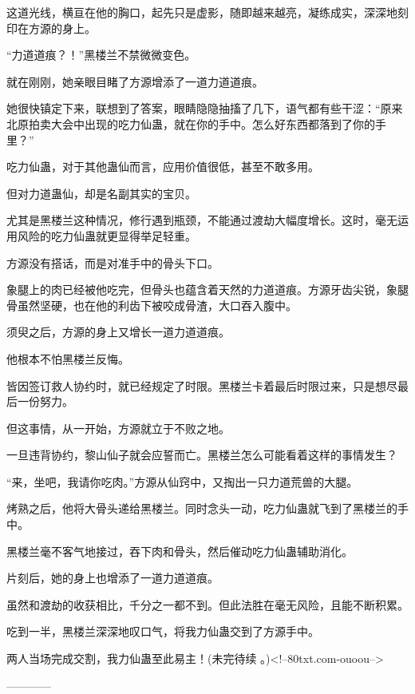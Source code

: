 \begin{this_body}
这道光线，横亘在他的胸口，起先只是虚影，随即越来越亮，凝练成实，深深地刻印在方源的身上。

“力道道痕？！”黑楼兰不禁微微变色。

就在刚刚，她亲眼目睹了方源增添了一道力道道痕。

她很快镇定下来，联想到了答案，眼睛隐隐抽搐了几下，语气都有些干涩：“原来北原拍卖大会中出现的吃力仙蛊，就在你的手中。怎么好东西都落到了你的手里？”

吃力仙蛊，对于其他蛊仙而言，应用价值很低，甚至不敢多用。

但对力道蛊仙，却是名副其实的宝贝。

尤其是黑楼兰这种情况，修行遇到瓶颈，不能通过渡劫大幅度增长。这时，毫无运用风险的吃力仙蛊就更显得举足轻重。

方源没有搭话，而是对准手中的骨头下口。

象腿上的肉已经被他吃完，但骨头也蕴含着天然的力道道痕。方源牙齿尖锐，象腿骨虽然坚硬，也在他的利齿下被咬成骨渣，大口吞入腹中。

须臾之后，方源的身上又增长一道力道道痕。

他根本不怕黑楼兰反悔。

皆因签订救人协约时，就已经规定了时限。黑楼兰卡着最后时限过来，只是想尽最后一份努力。

但这事情，从一开始，方源就立于不败之地。

一旦违背协约，黎山仙子就会应誓而亡。黑楼兰怎么可能看着这样的事情发生？

“来，坐吧，我请你吃肉。”方源从仙窍中，又掏出一只力道荒兽的大腿。

烤熟之后，他将大骨头递给黑楼兰。同时念头一动，吃力仙蛊就飞到了黑楼兰的手中。

黑楼兰毫不客气地接过，吞下肉和骨头，然后催动吃力仙蛊辅助消化。

片刻后，她的身上也增添了一道力道道痕。

虽然和渡劫的收获相比，千分之一都不到。但此法胜在毫无风险，且能不断积累。

吃到一半，黑楼兰深深地叹口气，将我力仙蛊交到了方源手中。

两人当场完成交割，我力仙蛊至此易主！(未完待续 。)<!--80txt.com-ouoou-->

------------

\end{this_body}

